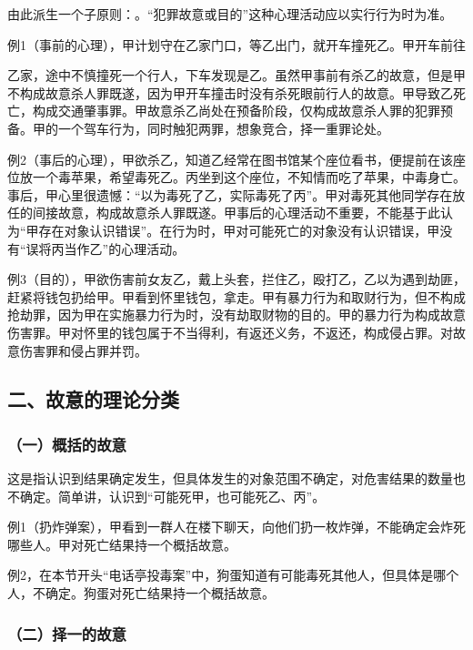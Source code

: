 由此派生一个子原则：。“犯罪故意或目的”这种心理活动应以实行行为时为准。

例1（事前的心理），甲计划守在乙家门口，等乙出门，就开车撞死乙。甲开车前往

乙家，途中不慎撞死一个行人，下车发现是乙。虽然甲事前有杀乙的故意，但是甲不构成故意杀人罪既遂，因为甲开车撞击时没有杀死眼前行人的故意。甲导致乙死亡，构成交通肇事罪。甲故意杀乙尚处在预备阶段，仅构成故意杀人罪的犯罪预备。甲的一个驾车行为，同时触犯两罪，想象竞合，择一重罪论处。

例2（事后的心理），甲欲杀乙，知道乙经常在图书馆某个座位看书，便提前在该座位放一个毒苹果，希望毒死乙。丙坐到这个座位，不知情而吃了苹果，中毒身亡。事后，甲心里很遗憾：“以为毒死了乙，实际毒死了丙”。甲对毒死其他同学存在放任的间接故意，构成故意杀人罪既遂。甲事后的心理活动不重要，不能基于此认为“甲存在对象认识错误”。在行为时，甲对可能死亡的对象没有认识错误，甲没有“误将丙当作乙”的心理活动。

例3（目的），甲欲伤害前女友乙，戴上头套，拦住乙，殴打乙，乙以为遇到劫匪，赶紧将钱包扔给甲。甲看到怀里钱包，拿走。甲有暴力行为和取财行为，但不构成抢劫罪，因为甲在实施暴力行为时，没有劫取财物的目的。甲的暴力行为构成故意伤害罪。甲对怀里的钱包属于不当得利，有返还义务，不返还，构成侵占罪。对故意伤害罪和侵占罪并罚。

\subsection*{二、故意的理论分类}

\subsubsection*{（一）概括的故意}

这是指认识到结果确定发生，但具体发生的对象范围不确定，对危害结果的数量也不确定。简单讲，认识到“可能死甲，也可能死乙、丙”。

例1（扔炸弹案），甲看到一群人在楼下聊天，向他们扔一枚炸弹，不能确定会炸死哪些人。甲对死亡结果持一个概括故意。

例2，在本节开头“电话亭投毒案”中，狗蛋知道有可能毒死其他人，但具体是哪个人，不确定。狗蛋对死亡结果持一个概括故意。

\subsubsection*{（二）择一的故意}

